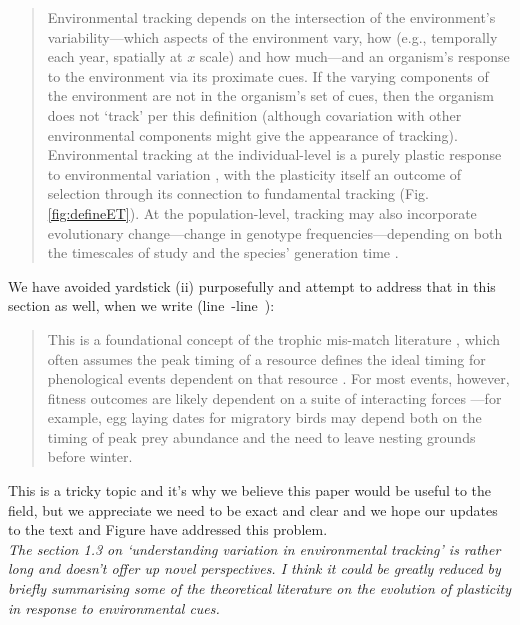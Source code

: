 \documentclass[11pt,letterpaper]{article}
\newcommand{\lr}[1]{line~\lineref{#1}}
\begin{document}
\begin{quote}
Environmental tracking depends on the intersection of the environment's variability---which aspects of the environment vary, how (e.g., temporally each year, spatially at $x$ scale) and how much---and an organism's response to the environment via its proximate cues. If the varying components of the environment are not in the organism's set of cues, then the organism does not `track' per this definition (although covariation with other environmental components might give the appearance of tracking). Environmental tracking at the individual-level is a purely plastic response to environmental variation \citep[in line with current findings on most climate change responses,][]{bonamour2019}, with the plasticity itself an outcome of selection \citep{chevin2010} through its connection to fundamental tracking (Fig. \ref{fig:defineET}). At the population-level, tracking may also incorporate evolutionary change---change in genotype frequencies---depending on both the timescales of study and the species' generation time \citep[this evolutionary response can be predicted as the difference between the environmental sensitivity of phenotypic selection and an organism's plasticity, $|B-b|$ in][]{chevin2010}.
\end{quote}
We have avoided yardstick (ii) purposefully and attempt to address that in this section as well, when we write (\lr{r4yardstickS}-\lr{r4yardstickE}):
\begin{quote}
This is a foundational concept of the trophic mis-match literature \citep{vissergienapp2019}, which often assumes the peak timing of a resource defines the ideal timing for phenological events dependent on that resource \citep[e.g. egg laying dates dependent on caterpillar abundance,][]{Visser:2005bg}. For most events, however, fitness outcomes are likely dependent on a suite of interacting forces \citep[e.g.,][]{reed2013}---for example, egg laying dates for migratory birds may depend both on the timing of peak prey abundance and the need to leave nesting grounds before winter.
\end{quote}
This is a tricky topic and it's why we believe this paper would be useful to the field, but we appreciate we need to be exact and clear and we hope our updates to the text and Figure have addressed this problem.\\

\emph{The section 1.3 on `understanding variation in environmental tracking' is rather long and
doesn't offer up novel perspectives. I think it could be greatly reduced by briefly
summarising some of the theoretical literature on the evolution of plasticity in response to
environmental cues.}\\
\end{document}
